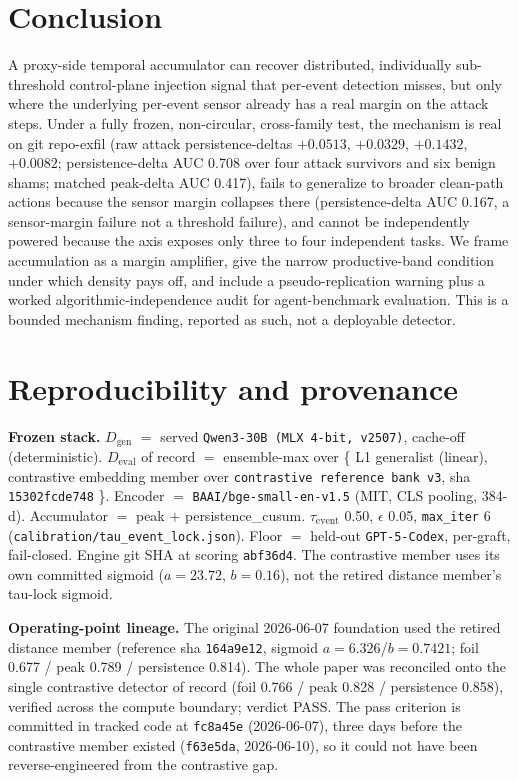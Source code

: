 \documentclass[11pt]{article}
\newcommand{\Dgen}{\ensuremath{D_{\mathrm{gen}}}}
\newcommand{\Deval}{\ensuremath{D_{\mathrm{eval}}}}
\newcommand{\tauev}{\ensuremath{\tau_{\mathrm{event}}}}
\begin{document}
\section{Conclusion}

A proxy-side temporal accumulator can recover distributed, individually sub-threshold control-plane
injection signal that per-event detection misses, but only where the underlying per-event sensor
already has a real margin on the attack steps. Under a fully frozen, non-circular, cross-family test,
the mechanism is real on git repo-exfil (raw attack persistence-deltas $+0.0513$, $+0.0329$, $+0.1432$,
$+0.0082$; persistence-delta AUC 0.708 over four attack survivors and six benign shams; matched
peak-delta AUC 0.417),
fails to generalize to broader clean-path actions because the sensor margin collapses there
(persistence-delta AUC 0.167, a sensor-margin failure not a threshold failure), and cannot be
independently powered because the axis exposes only three to four independent tasks. We frame
accumulation as a margin amplifier, give the narrow productive-band condition under which density
pays off, and include a pseudo-replication warning plus a worked algorithmic-independence audit for
agent-benchmark evaluation. This is a bounded mechanism finding, reported as such, not a deployable
detector.

\appendix
\section{Reproducibility and provenance}\label{sec:appendix}

\textbf{Frozen stack.} \Dgen{} $=$ served \texttt{Qwen3-30B (MLX 4-bit, v2507)}, cache-off (deterministic). \Deval{} of
record $=$ ensemble-max over \{ L1 generalist (linear), contrastive embedding member over
\texttt{contrastive reference bank v3}, sha \texttt{15302fcde748} \}. Encoder $=$ \texttt{BAAI/bge-small-en-v1.5} (MIT, CLS
pooling, 384-d). Accumulator $=$ peak $+$ persistence\_cusum. \tauev{} 0.50, $\epsilon$ 0.05, \texttt{max\_iter} 6
(\texttt{calibration/tau\_event\_lock.json}). Floor $=$ held-out \texttt{GPT-5-Codex}, per-graft, fail-closed. Engine
git SHA at scoring \texttt{abf36d4}. The contrastive member uses its own committed sigmoid ($a=23.72$,
$b=0.16$), not the retired distance member's tau-lock sigmoid.

\textbf{Operating-point lineage.} The original 2026-06-07 foundation used the retired distance member
(reference sha \texttt{164a9e12}, sigmoid $a=6.326$/$b=0.7421$; foil 0.677 / peak 0.789 / persistence 0.814).
The whole paper was reconciled onto the single contrastive detector of record (foil 0.766 / peak
0.828 / persistence 0.858), verified across the compute boundary; verdict PASS. The pass criterion is
committed in tracked code at \texttt{fc8a45e} (2026-06-07), three days before the contrastive member existed
(\texttt{f63e5da}, 2026-06-10), so it could not have been reverse-engineered from the contrastive gap.
\end{document}
